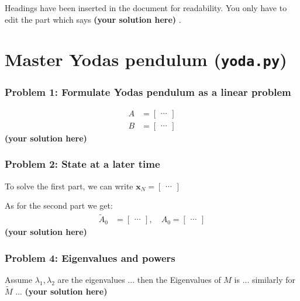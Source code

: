 \documentclass[12pt,twoside]{article}
\newcommand\redt[1]{ {\textcolor[rgb]{0.60, 0.00, 0.00}{\textbf{ #1} } } }
\newcommand{\m}[1]{\boldsymbol{ #1}}
\newcommand{\yoursolution}{ \redt{(your solution here) } }
\begin{document}
Headings have been inserted in the document for readability. You only have to edit the part which says \yoursolution. 

\section{Master Yodas pendulum (\texttt{yoda.py})}\label{yoda1}
\subsubsection*{{\color{red}Problem 1:  Formulate Yodas pendulum as a linear problem}}
	
	\begin{align}
		A & = \begin{bmatrix} \cdots \end{bmatrix}  \\
		B & = \begin{bmatrix} \cdots \end{bmatrix}
	\end{align}
	\yoursolution 	
	
\subsubsection*{{\color{red}Problem 2:  State at a later time}}
	
		To solve the first part, we can write $\m x_N = \begin{bmatrix} \cdots \end{bmatrix}$
		
		As for the second part we get:
\begin{align}
\tilde A_0 & = \begin{bmatrix} \cdots \end{bmatrix}, \quad A_0 = \begin{bmatrix} \cdots \end{bmatrix}
\end{align}
		\yoursolution 	
\subsubsection*{{\color{red}Problem 4:  Eigenvalues and powers}}
	
Assume $\lambda_1, \lambda_2$ are the eigenvalues ... then the Eigenvalues of $M$ is ... similarly for $\tilde M$ ... 
\yoursolution
	
\end{document}
